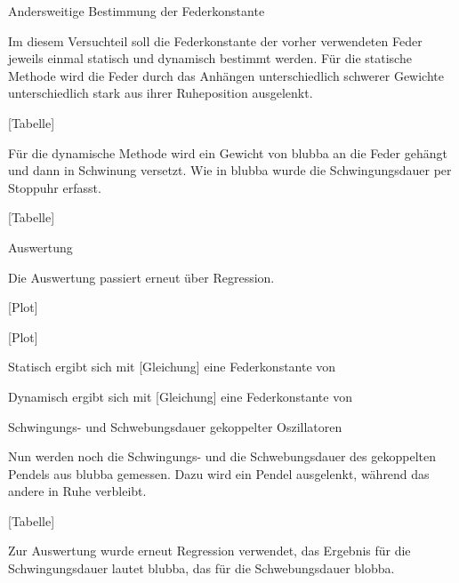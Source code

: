 Andersweitige Bestimmung der Federkonstante

Im diesem Versuchteil soll die Federkonstante der vorher verwendeten Feder jeweils einmal statisch und dynamisch bestimmt werden.
Für die statische Methode wird die Feder durch das Anhängen unterschiedlich schwerer Gewichte unterschiedlich stark aus ihrer Ruheposition ausgelenkt.

[Tabelle]

Für die dynamische Methode wird ein Gewicht von blubba an die Feder gehängt und dann in Schwinung versetzt. Wie in blubba wurde die Schwingungsdauer per Stoppuhr erfasst.

[Tabelle]

Auswertung

Die Auswertung passiert erneut über Regression.


[Plot]

[Plot]

Statisch ergibt sich mit [Gleichung] eine Federkonstante von

Dynamisch ergibt sich mit [Gleichung] eine Federkonstante von

Schwingungs- und Schwebungsdauer gekoppelter Oszillatoren

Nun werden noch die Schwingungs- und die Schwebungsdauer des gekoppelten Pendels aus blubba gemessen.
Dazu wird ein Pendel ausgelenkt, während das andere in Ruhe verbleibt.

[Tabelle]

Zur Auswertung wurde erneut Regression verwendet, das Ergebnis für die Schwingungsdauer lautet blubba, das für die Schwebungsdauer blobba.